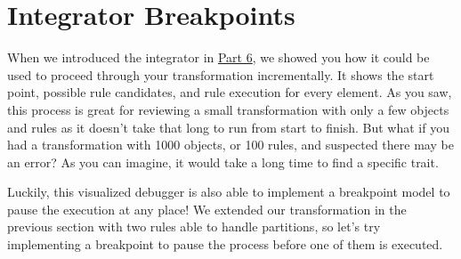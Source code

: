 \newpage
\hypertarget{sec:breakpoints}{}
\section{Integrator Breakpoints}
\genHeader

When we introduced the integrator in \hyperlink{sec:app_integrator}{Part 6}, we showed you how it could be used to proceed through your transformation
incrementally. It shows the start point, possible rule candidates, and rule execution for every element. As you saw, this process
is great for reviewing a small transformation with only a few objects and rules as it doesn't take that long to run from start to finish. But what if you had a
transformation with 1000 objects, or 100 rules, and suspected there may be an error? As you can imagine, it would take a long time to find a specific trait.

Luckily, this visualized debugger is also able to implement a breakpoint model to pause the execution at any place! We extended our transformation in
the previous section with two rules able to handle partitions, so let's try implementing a breakpoint to pause the process before one of them is executed.

